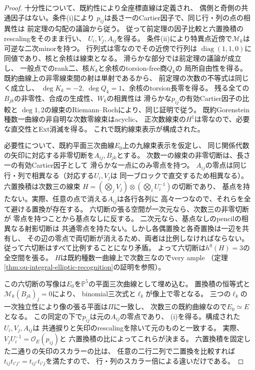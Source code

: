 \begin{proof}
十分性について、既約性により全座標直線は定義され、
偶側と奇側の共通因子はない。条件(i)により
$p_{ij}$は長さ一のCartier因子で、同じ行・列の点の相異性は
前定理の勾配の議論から従う。
従って前定理の因子比較と六置換積のrescalingをそのまま行い、
$U_i,V_j,A_{ij}$を得る。
条件(ii)により特異点近傍で$\mathscr M_k$は可逆な二次minorを持つ。
行列式は零なのでその近傍で行列は
$\operatorname{diag}(1,1,0)$に同値であり、核と余核は線束となる。
滑らかな部分では前定理の議論が成立し、
一般点でのrank二、核$K_k$と余核のtorsion-free商$Q_k$の
局所自由性を得る。
既約曲線上の非零線束間の射は単射であるから、
前定理の次数の不等式は同じく成立し、
$\deg K_k=-2,\ \deg Q_k=1$、余核のtorsion長零を得る。
残る全ての$B_{jk}$の非零性、合成の生成性、$W_k$の相異性は
滑らかな$p_{ij}$の有効Cartier因子の比較と
$\deg1,2$の線束のRiemann--Rochにより、同じ証明で従う。
既約Gorenstein種数一曲線の非自明な次数零線束はacyclic、
正次数線束の$H^1$は零なので、必要な直交性とExt消滅を得る。
これで既約線束表示が構成された。

必要性について、既約平面三次曲線$E_0$上の九線束表示を仮定し、
同じ関係代数の矢印に対応する非零切断を$A_{ij},B_{jk}$とする。
次数一の線束の非零切断は、長さ一の有効Cartier因子として
滑らかな一点にのみ零点を持つ。
$A_{ij}$の零点は同じ行・列で相異なる（対応する$U_i,V_j$は
同一ブロックで直交するため相異なる）。
六置換積は次数三の線束
$H=(\bigotimes_jV_j)\otimes(\bigotimes_iU_i^{-1})$の切断であり、
基点を持たない。実際、任意の点で消える$A_{ij}$は各行各列に
高々一つなので、それらを全て避ける置換が存在する。
六切断の張る空間が一次元なら、次数三の非零切断が
零点を持つことから基点なしに反する。
二次元なら、基点なしのpencilの相異なる射影切断は
共通零点を持たない。しかし各偶置換と各奇置換は一辺を共有し、
その辺の零点で両切断が消えるため、両者は比例しなければならない。
従って六切断はすべて比例することになり矛盾。
よって六切断は$h^0(H)=3$の全空間を張る。
$H$は既約種数一曲線上で次数三なのでvery ample
（定理\ref{thm:ou-integral-elliptic-recognition}の証明を参照）。

この六切断の写像は$E_0$を$\mathbb P^5$の平面三次曲線として埋め込む。
置換積の恒等式と$\mathscr M_k(B_{jk})_j=0$により、
binomial三次式と$\ell_k$が像上で零となる。
三つの$\ell_k$の一次独立性により像の張る平面は$\Pi$に一致し、
次数三の既約曲線なので$E_0\simeq E$となる。
この同定の下で$p_{ij}$は元の$A_{ij}$の零点であり、
(i)を得る。構成された$U_i,V_j,A_{ij}$は
共通捩りと矢印のrescalingを除いて元のものと一致する。
実際、$V_jU_i^{-1}=\mathcal O_E(p_{ij})$と
六置換積の比によってこれらが決まる。
六置換積を固定した二通りの矢印のスカラーの比は、
任意の二行二列で二置換を比較すれば
$t_{ij}t_{i'j'}=t_{ij'}t_{i'j}$を満たすので、
行・列のスカラー倍による違いだけである。


\end{proof}
